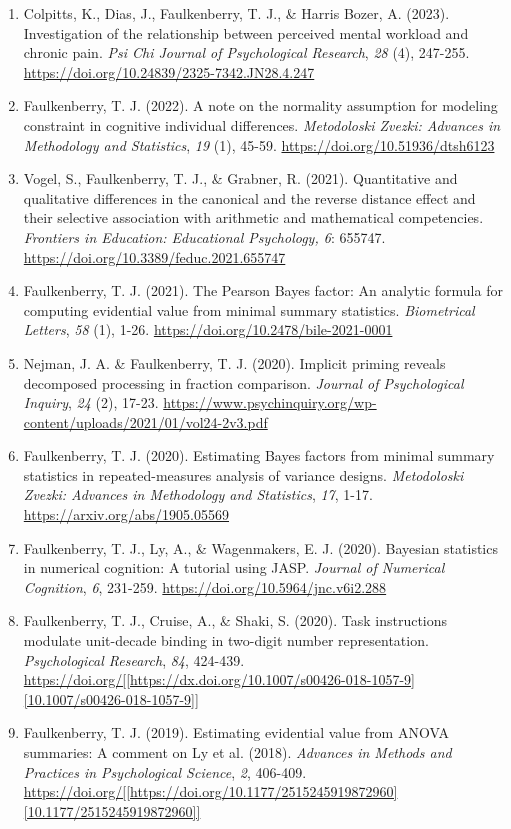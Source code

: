\documentclass[article,10pt]{article}
\begin{document}
\begin{enumerate}
\item Colpitts, K., Dias, J., Faulkenberry, T. J., \& Harris Bozer, A. (2023). Investigation of the relationship between perceived mental workload and chronic pain. \emph{Psi Chi Journal of Psychological Research}, \emph{28} (4), 247-255. \url{https://doi.org/10.24839/2325-7342.JN28.4.247}
\item Faulkenberry, T. J. (2022). A note on the normality assumption for modeling constraint in cognitive individual differences. \emph{Metodoloski Zvezki: Advances in Methodology and Statistics}, \emph{19} (1), 45-59. \url{https://doi.org/10.51936/dtsh6123}
\item Vogel, S., Faulkenberry, T. J., \& Grabner, R. (2021). Quantitative and qualitative differences in the canonical and the reverse distance effect and their selective association with arithmetic and mathematical competencies. \emph{Frontiers in Education: Educational Psychology, 6}: 655747. \url{https://doi.org/10.3389/feduc.2021.655747}
\item Faulkenberry, T. J. (2021). The Pearson Bayes factor: An analytic formula for computing evidential value from minimal summary statistics. \emph{Biometrical Letters}, \emph{58} (1), 1-26. \url{https://doi.org/10.2478/bile-2021-0001}
\item Nejman, J. A. \& Faulkenberry, T. J. (2020). Implicit priming reveals decomposed processing in fraction comparison. \emph{Journal of Psychological Inquiry}, \emph{24} (2), 17-23. \url{https://www.psychinquiry.org/wp-content/uploads/2021/01/vol24-2v3.pdf}
\item Faulkenberry, T. J. (2020). Estimating Bayes factors from minimal summary statistics in repeated-measures analysis of variance designs. \emph{Metodoloski Zvezki: Advances in Methodology and Statistics}, \emph{17}, 1-17.  \url{https://arxiv.org/abs/1905.05569}
\item Faulkenberry, T. J., Ly, A., \& Wagenmakers, E. J. (2020). Bayesian statistics in numerical cognition: A tutorial using JASP. \emph{Journal of Numerical Cognition}, \emph{6}, 231-259. \url{https://doi.org/10.5964/jnc.v6i2.288}
\item Faulkenberry, T. J., Cruise, A., \& Shaki, S. (2020). Task instructions modulate unit-decade binding in two-digit number representation. \emph{Psychological Research}, \emph{84}, 424-439. \url{https://doi.org/[[https://dx.doi.org/10.1007/s00426-018-1057-9][10.1007/s00426-018-1057-9]]}
\item Faulkenberry, T. J. (2019). Estimating evidential value from ANOVA summaries: A comment on Ly et al. (2018). \emph{Advances in Methods and Practices in Psychological Science}, \emph{2}, 406-409. \url{https://doi.org/[[https://doi.org/10.1177/2515245919872960][10.1177/2515245919872960]]}

\end{enumerate}
\end{document}
